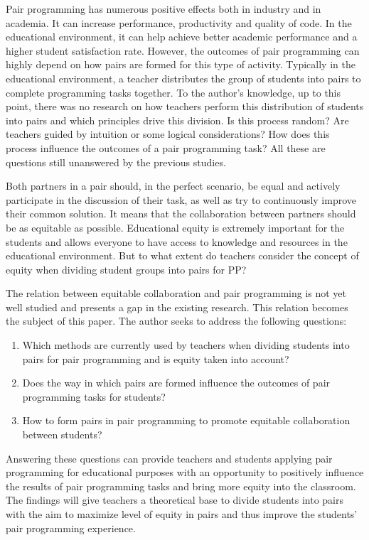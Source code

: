 \documentclass[conference]{IEEEtran}
\begin{document}
Pair programming has numerous positive effects both in industry and in academia. It can increase performance, productivity and quality of code. In the educational environment, it can help achieve better academic performance and a higher student satisfaction rate. However, the outcomes of pair programming can highly depend on how pairs are formed for this type of activity. Typically in the educational environment, a teacher distributes the group of students into pairs to complete programming tasks together. To the author's knowledge, up to this point, there was no research on how teachers perform this distribution of students into pairs and which principles drive this division. Is this process random? Are teachers guided by intuition or some logical considerations? How does this process influence the outcomes of a pair programming task? All these are questions still unanswered by the previous studies.

Both partners in a pair should, in the perfect scenario, be equal and actively participate in the discussion of their task, as well as try to continuously improve their common solution. It means that the collaboration between partners should be as equitable as possible. Educational equity is extremely important for the students and allows everyone to have access to knowledge and resources in the educational environment. But to what extent do teachers consider the concept of equity when dividing student groups into pairs for PP? 

The relation between equitable collaboration and pair programming is not yet well studied and presents a gap in the existing research. This relation becomes the subject of this paper. The author seeks to address the following questions:
\begin{enumerate}
    \item Which methods are currently used by teachers when dividing students into pairs for pair programming and is equity taken into account?
    \item Does the way in which pairs are formed influence the outcomes of pair programming tasks for students? 
    \item How to form pairs in pair programming to promote equitable collaboration between students?
\end{enumerate}

Answering these questions can provide teachers and students applying pair programming for educational purposes with an opportunity to positively influence the results of pair programming tasks and bring more equity into the classroom. The findings will give teachers a theoretical base to divide students into pairs with the aim to maximize level of equity in pairs and thus improve the students' pair programming experience.
\end{document}
